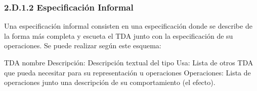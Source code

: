 \begin{example}
\begin{itemize}
\begin{itemize}
\end{itemize}
\end{itemize}
\end{example}



\subsubsection*{2.D.1.2 Especificación Informal}
 


Una especificación informal consisten en una especificación donde se describe de la forma más completa y escueta el TDA junto con la especificación de su operaciones. Se puede realizar según este esquema:

\begin{pyverbatim}[][frame=single]
TDA nombre 
    Descripción: Descripción textual del tipo
    Usa: Lista de otros TDA que pueda necesitar para su representación u 
         operaciones
    Operaciones: Lista de operaciones junto una descripción de su 
                 comportamiento (el efecto).
\end{pyverbatim}





